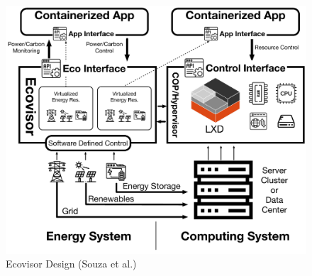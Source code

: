 \begin{figure}
    \centering
    \includegraphics[width=\linewidth]{figures/ecovisor_design}
    \caption{Ecovisor Design (Souza et al.) \cite{souza2023}}
    \label{fig:ecovisor_design}
\end{figure}

